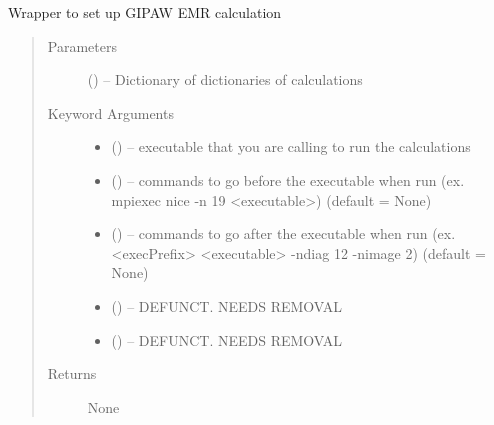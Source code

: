 \documentclass[letterpaper,10pt,english]{sphinxmanual}
\begin{document}
\begin{fulllineitems}
\label{\detokenize{run:run.emr}}
Wrapper to set up GIPAW EMR calculation
\begin{quote}\begin{description}
\item[{Parameters}] \leavevmode
{} () -- Dictionary of dictionaries of calculations

\item[{Keyword Arguments}] \leavevmode\begin{itemize}
\item {} 
 () -- executable that you are calling to run the calculations

\item {} 
 () -- commands to go before the executable when run
(ex. mpiexec nice -n 19 \textless{}executable\textgreater{}) (default = None)

\item {} 
 () -- commands to go after the executable when run
(ex. \textless{}execPrefix\textgreater{} \textless{}executable\textgreater{} -ndiag 12 -nimage 2) (default = None)

\item {} 
 () -- DEFUNCT. NEEDS REMOVAL

\item {} 
 () -- DEFUNCT. NEEDS REMOVAL

\end{itemize}

\item[{Returns}] \leavevmode
None

\end{description}\end{quote}

\end{fulllineitems}

\end{document}
